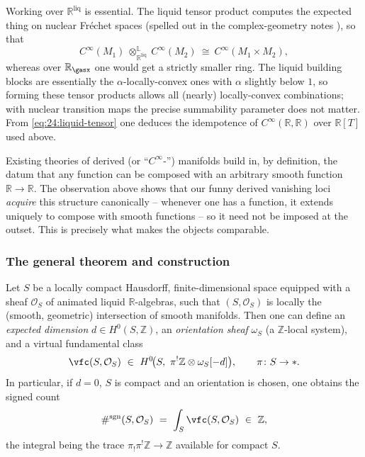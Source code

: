 \begin{remark}
\label{rmk:24:liquid-tensor}
Working over $\mathbb R^{\mathrm{liq}}$ is essential. The liquid tensor product
computes the expected thing on nuclear Fréchet spaces (spelled out in the
complex-geometry notes \cite{clausen2020analytic}), so that
\begin{equation}
\label{eq:24:liquid-tensor}
C^\infty(M_1)\ \otimes_{\mathbb R^{\mathrm{liq}}}^{\mathbb L}\ C^\infty(M_2)\
\cong\ C^\infty(M_1\times M_2),
\end{equation}
whereas over $\mathbb R_{\gasx}$ one would get a strictly smaller ring. The liquid
building blocks are essentially the $\alpha$-locally-convex ones with $\alpha$
slightly below $1$, so forming these tensor products allows all (nearly)
locally-convex combinations; with nuclear transition maps the precise summability
parameter does not matter. From \eqref{eq:24:liquid-tensor} one deduces the
idempotence of $C^\infty(\mathbb R,\mathbb R)$ over $\mathbb R[T]$ used above.
\end{remark}

\begin{remark}
\label{rmk:24:cinfty-ring}
Existing theories of derived (or ``$C^\infty$-'') manifolds build in, by
definition, the datum that any function can be composed with an arbitrary smooth
function $\mathbb R\to\mathbb R$. The observation above shows that our funny
derived vanishing loci \emph{acquire} this structure canonically -- whenever one
has a function, it extends uniquely to compose with smooth functions -- so it
need not be imposed at the outset. This is precisely what makes the objects
comparable.
\end{remark}

\subsubsection*{The general theorem and construction}

\begin{theorem}
\label{thm:24:vfc}
Let $S$ be a locally compact Hausdorff, finite-dimensional space equipped with a
sheaf $\mathcal O_S$ of animated liquid $\mathbb R$-algebras, such that
$(S,\mathcal O_S)$ is locally the (smooth, geometric) intersection of smooth
manifolds. Then one can define an \emph{expected dimension}
$d\in H^0(S,\mathbb Z)$, an \emph{orientation sheaf} $\omega_S$ (a
$\mathbb Z$-local system), and a virtual fundamental class
\begin{equation*}
\vfc(S,\mathcal O_S)\ \in\ H^0\!\bigl(S,\ \pi^!\mathbb Z\otimes\omega_S[-d]\bigr),
\qquad \pi\colon S\to\ast .
\end{equation*}
In particular, if $d=0$, $S$ is compact and an orientation is chosen, one obtains
the signed count
\begin{equation*}
\#^{\mathrm{sgn}}(S,\mathcal O_S)\ =\ \int_S\vfc(S,\mathcal O_S)\ \in\ \mathbb Z ,
\end{equation*}
the integral being the trace $\pi_!\pi^!\mathbb Z\to\mathbb Z$ available for
compact $S$.
\end{theorem}

